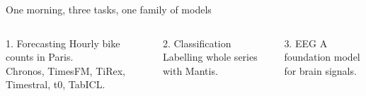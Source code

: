 \begin{frame}{One morning, three tasks, one family of models}
  \begin{columns}[T]
    \begin{block}{1. Forecasting}
      Hourly bike counts in Paris.\\
      Chronos, TimesFM, TiRex, Timestral, t0, TabICL.
    \end{block}
    \begin{alertblock}{2. Classification}
      Labelling whole series\\with Mantis.
    \end{alertblock}
    \begin{exampleblock}{3. EEG}
      A foundation model\\for brain signals.
    \end{exampleblock}
  \end{columns}
\end{frame}
